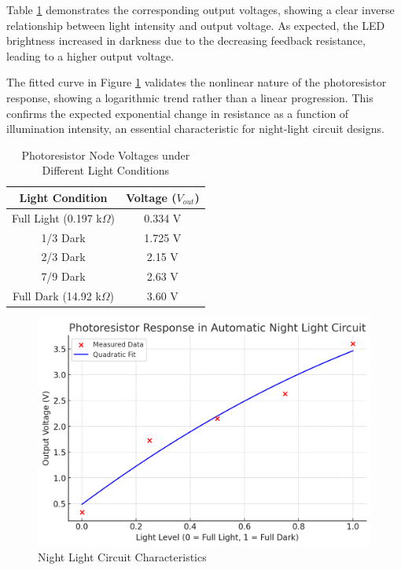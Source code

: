 \documentclass[12pt]{article}
\begin{document}
Table \ref{tab:photoresistor} demonstrates the corresponding output voltages,
showing a clear inverse relationship between light intensity and output voltage.
As expected, the LED brightness increased in darkness due to the decreasing
feedback resistance, leading to a higher output voltage.

The fitted curve in Figure \ref{fig:exp3} validates the nonlinear nature of the
photoresistor response, showing a logarithmic trend rather than a linear
progression. This confirms the expected exponential change in resistance as a
function of illumination intensity, an essential characteristic for night-light
circuit designs.

\begin{table}[H]
	\centering
	\begin{tabular}{|c|c|}
		\hline
		\textbf{Light Condition}     & \textbf{Voltage ($V_{out}$)} \\
		\hline
		Full Light (0.197 k$\Omega$) & 0.334 V                      \\
		\hline
		1/3 Dark                     & 1.725 V                      \\
		\hline
		2/3 Dark                     & 2.15 V                       \\
		\hline
		7/9 Dark                     & 2.63 V                       \\
		\hline
		Full Dark (14.92 k$\Omega$)  & 3.60 V                       \\
		\hline
	\end{tabular}
	\caption{Photoresistor Node Voltages under Different Light Conditions}
	\label{tab:photoresistor}
\end{table}


\begin{figure}[H]
	\centering
	\includegraphics[width=12cm]{03_exp3}
	\caption{Night Light Circuit Characteristics}
	\label{fig:exp3}
\end{figure}
\end{document}
